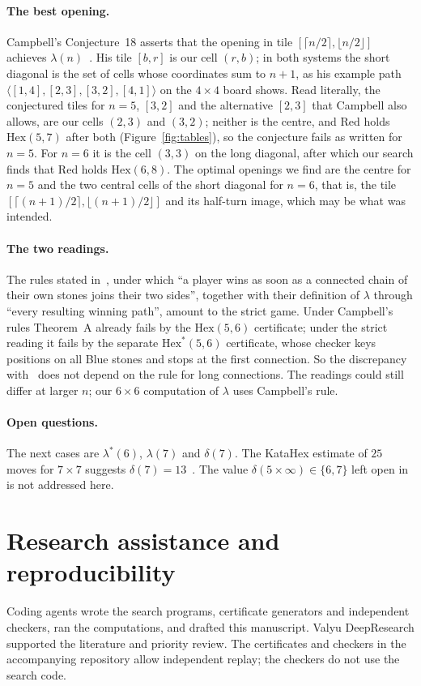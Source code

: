 \documentclass[11pt]{amsart}
\theoremstyle{definition}
\theoremstyle{remark}
\newcommand{\Hex}{\mathrm{Hex}}
\begin{document}
\paragraph{The best opening.} Campbell's Conjecture~18 asserts that the opening in tile $[\lceil n/2\rceil,\lfloor n/2\rfloor]$ achieves $\lambda(n)$~\cite{Campbell2004}. His tile $[b,r]$ is our cell $(r,b)$; in both systems the short diagonal is the set of cells whose coordinates sum to $n+1$, as his example path $\langle[1,4],[2,3],[3,2],[4,1]\rangle$ on the $4\times4$ board shows. Read literally, the conjectured tiles for $n=5$, $[3,2]$ and the alternative $[2,3]$ that Campbell also allows, are our cells $(2,3)$ and $(3,2)$; neither is the centre, and Red holds $\Hex(5,7)$ after both (Figure~\ref{fig:tables}), so the conjecture fails as written for $n=5$. For $n=6$ it is the cell $(3,3)$ on the long diagonal, after which our search finds that Red holds $\Hex(6,8)$. The optimal openings we find are the centre for $n=5$ and the two central cells of the short diagonal for $n=6$, that is, the tile $[\lceil (n+1)/2\rceil,\lfloor (n+1)/2\rfloor]$ and its half-turn image, which may be what was intended.

\paragraph{The two readings.} The rules stated in~\cite{CPS2026}, under which ``a player wins as soon as a connected chain of their own stones joins their two sides'', together with their definition of $\lambda$ through ``every resulting winning path'', amount to the strict game. Under Campbell's rules Theorem~A already fails by the $\Hex(5,6)$ certificate; under the strict reading it fails by the separate $\Hex^{*}(5,6)$ certificate, whose checker keys positions on all Blue stones and stops at the first connection. So the discrepancy with~\cite{CPS2026} does not depend on the rule for long connections. The readings could still differ at larger $n$; our $6\times6$ computation of $\lambda$ uses Campbell's rule.

\paragraph{Open questions.} The next cases are $\lambda^{*}(6)$, $\lambda(7)$ and $\delta(7)$. The KataHex estimate of $25$ moves for $7\times7$ suggests $\delta(7)=13$~\cite{HZY2024}. The value $\delta(5\times\infty)\in\{6,7\}$ left open in~\cite{CPS2026} is not addressed here.

\ifdefined\journalversion
\section*{Research assistance and reproducibility}
Coding agents wrote the search programs, certificate generators and independent checkers, ran the computations, and drafted this manuscript. Valyu DeepResearch supported the literature and priority review. The certificates and checkers in the accompanying repository allow independent replay; the checkers do not use the search code.
\fi



\end{document}
